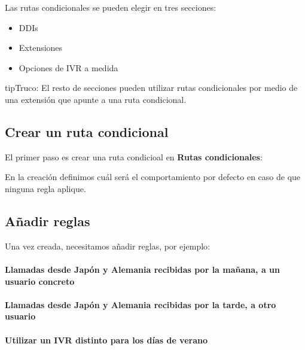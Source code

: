 \documentclass[letterpaper,10pt,spanish]{sphinxmanual}
\begin{document}
Las rutas condicionales se pueden elegir en tres secciones:
\begin{itemize}
\item {} 
DDIs

\item {} 
Extensiones

\item {} 
Opciones de IVR a medida

\end{itemize}

\begin{notice}{tip}{Truco:}
El resto de secciones pueden utilizar rutas condicionales por medio de una extensión que apunte a una ruta condicional.
\end{notice}


\subsection{Crear un ruta condicional}
\label{pbx_features/conditional_routes:creating-a-conditional-route}
El primer paso es crear una ruta condicioal en \textbf{Rutas condicionales}:

\noindent{}

En la creación definimos cuál será el comportamiento por defecto en caso de que ninguna regla aplique.


\subsection{Añadir reglas}
\label{pbx_features/conditional_routes:adding-rules}
Una vez creada, necesitamos añadir reglas, por ejemplo:
\paragraph{Llamadas desde Japón y Alemania recibidas por la mañana, a un usuario concreto}

\noindent{}
\paragraph{Llamadas desde Japón y Alemania recibidas por la tarde, a otro usuario}

\noindent{}
\paragraph{Utilizar un IVR distinto para los días de verano}
\end{document}
